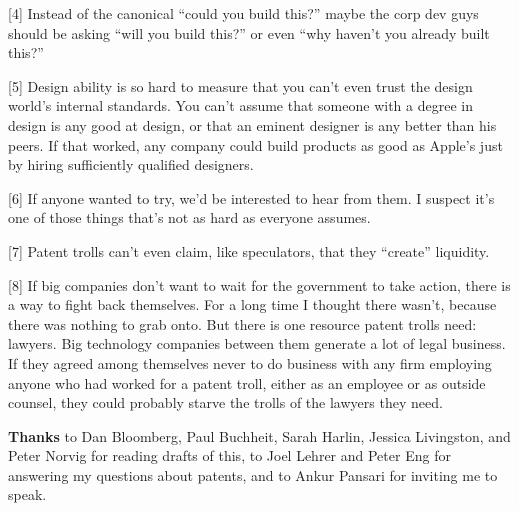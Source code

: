 {[}4{]} Instead of the canonical ``could you build this?'' maybe the
corp dev guys should be asking ``will you build this?'' or even ``why
haven't you already built this?''

{[}5{]} Design ability is so hard to measure that you can't even trust
the design world's internal standards. You can't assume that someone
with a degree in design is any good at design, or that an eminent
designer is any better than his peers. If that worked, any company could
build products as good as Apple's just by hiring sufficiently qualified
designers.

{[}6{]} If anyone wanted to try, we'd be interested to hear from them. I
suspect it's one of those things that's not as hard as everyone assumes.

{[}7{]} Patent trolls can't even claim, like speculators, that they
``create'' liquidity.

{[}8{]} If big companies don't want to wait for the government to take
action, there is a way to fight back themselves. For a long time I
thought there wasn't, because there was nothing to grab onto. But there
is one resource patent trolls need: lawyers. Big technology companies
between them generate a lot of legal business. If they agreed among
themselves never to do business with any firm employing anyone who had
worked for a patent troll, either as an employee or as outside counsel,
they could probably starve the trolls of the lawyers they need.

\textbf{Thanks} to Dan Bloomberg, Paul Buchheit, Sarah Harlin, Jessica
Livingston, and Peter Norvig for reading drafts of this, to Joel Lehrer
and Peter Eng for answering my questions about patents, and to Ankur
Pansari for inviting me to speak.
